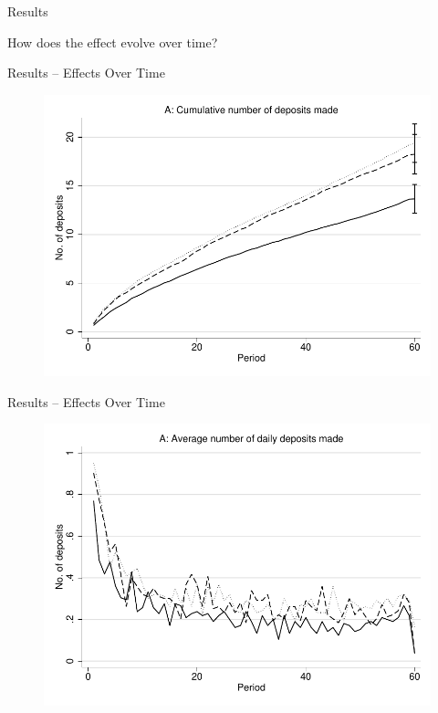 \documentclass[aspectratio=169]{beamer}
\begin{document}
\begin{frame}{Results}
	
	\centering \large How does the effect evolve over time?

\end{frame}

\begin{frame}{Results -- Effects Over Time}

	\begin{figure}[H]
		\centering
		\includegraphics[height=0.8\textheight]{line-mobile_cumdeposits.pdf}
	\end{figure}

\end{frame}

\begin{frame}{Results -- Effects Over Time}

	\begin{figure}[H]
		\centering
		\includegraphics[height=0.8\textheight]{line-mobile_deposits.pdf}
	\end{figure}

\end{frame}
\end{document}
